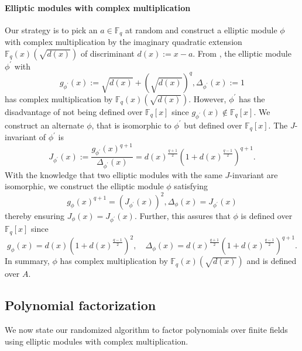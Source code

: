 \documentclass[12pt]{article}
\theoremstyle{plain}
\theoremstyle{definition}
\def\F{\ensuremath{\mathbb{F}}}
\newcommand{\D}{\Delta}
\begin{document}
\paragraph{Elliptic modules with complex multiplication}
Our strategy is to pick an $a \in \F_q$ at random and construct a elliptic module $\phi$ with 
complex multiplication by the imaginary quadratic extension $\F_q(x)(\sqrt{d(x)})$ of discriminant 
$d(x):=x-a$. From \cite{dor}, the elliptic module $\phi^\prime$ with 
\[ g_{\phi^\prime}(x):=\sqrt{d(x)}+\left(\sqrt{d(x)}\right)^q, \D_{\phi^\prime}(x) := 1 \]
has complex multiplication by $\F_q(x)(\sqrt{d(x)})$.
However, $\phi^\prime$ has the disadvantage of not being defined over $\F_q[x]$ since 
$g_{\phi^\prime}(x) \notin \F_q[x]$.
We construct an alternate $\phi$, that is isomorphic to $\phi^\prime$ but defined over $\F_q[x]$. 
The $J$-invariant \cite{gek} of $\phi^\prime$ is 
\[ J_{\phi^\prime}(x) := \frac{g_{\phi^\prime}(x)^{q+1}}{\D_{\phi^\prime}(x)} = 
d(x)^{\frac{q+1}{2}}\left(1+d(x)^{\frac{q-1}{2}}\right)^{q+1}. \]
With the knowledge that two elliptic modules with the same $J$-invariant are isomorphic, we 
construct the elliptic module $\phi$ satisfying 
\[ g_\phi(x)^{q+1} = (J_{\phi^\prime}(x))^2, \D_{\phi}(x)= J_{\phi^\prime}(x)\] thereby ensuring 
$J_{\phi}(x)=J_{\phi^\prime}(x)$. Further, this assures that $\phi$ is defined over $\F_q[x]$ since
\[g_\phi(x) = d(x)\left(1 + d(x)^{\frac{q-1}{2}}\right)^2, \quad  \D_\phi(x) = d(x)^{\frac{q + 
1}{2}}\left(1 + d(x)^{\frac{q-1}{2}}\right)^{q+1}. \]
In summary, $\phi$ has complex multiplication by $\F_q(x)(\sqrt{d(x)})$ and is defined over $A$.



\subsection{Polynomial factorization}

We now state our randomized algorithm to factor polynomials over finite fields using elliptic 
modules with complex multiplication.
\end{document}
